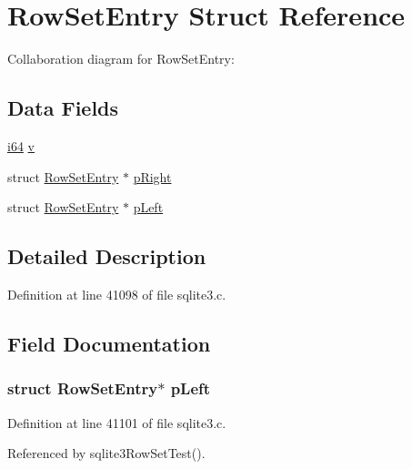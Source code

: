 \hypertarget{struct_row_set_entry}{}\section{Row\+Set\+Entry Struct Reference}
\label{struct_row_set_entry}


Collaboration diagram for Row\+Set\+Entry\+:
\subsection*{Data Fields}
\begin{DoxyCompactItemize}
\item 
\hyperlink{sqlite3_8c_a2a0f0f4ae7001eb54351f77ea1cdbcfd}{i64} \hyperlink{struct_row_set_entry_a6b83b4ae6bcb5f4033acf9f93959363f}{v}
\item 
struct \hyperlink{struct_row_set_entry}{Row\+Set\+Entry} $\ast$ \hyperlink{struct_row_set_entry_a5446f488550091a9170f6972c1861ee2}{p\+Right}
\item 
struct \hyperlink{struct_row_set_entry}{Row\+Set\+Entry} $\ast$ \hyperlink{struct_row_set_entry_ac9d89c0d5f3c7c2d4b98ab9c6b972128}{p\+Left}
\end{DoxyCompactItemize}


\subsection{Detailed Description}


Definition at line 41098 of file sqlite3.\+c.



\subsection{Field Documentation}
\hypertarget{struct_row_set_entry_ac9d89c0d5f3c7c2d4b98ab9c6b972128}{}
\subsubsection[{p\+Left}]{\setlength{\rightskip}{0pt plus 5cm}struct {\bf Row\+Set\+Entry}$\ast$ p\+Left}\label{struct_row_set_entry_ac9d89c0d5f3c7c2d4b98ab9c6b972128}


Definition at line 41101 of file sqlite3.\+c.



Referenced by sqlite3\+Row\+Set\+Test().

